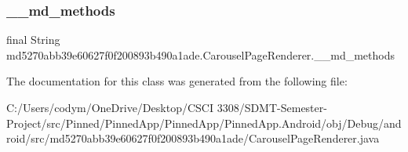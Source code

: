 \subsubsection{\texorpdfstring{\+\_\+\+\_\+md\+\_\+methods}{\_\_md\_methods}}
{\footnotesize\ttfamily final String md5270abb39e60627f0f200893b490a1ade.\+Carousel\+Page\+Renderer.\+\_\+\+\_\+md\+\_\+methods\hspace{0.3cm}{\ttfamily [static]}}



The documentation for this class was generated from the following file\+:\begin{DoxyCompactItemize}
\item 
C\+:/\+Users/codym/\+One\+Drive/\+Desktop/\+C\+S\+C\+I 3308/\+S\+D\+M\+T-\/\+Semester-\/\+Project/src/\+Pinned/\+Pinned\+App/\+Pinned\+App/\+Pinned\+App.\+Android/obj/\+Debug/android/src/md5270abb39e60627f0f200893b490a1ade/Carousel\+Page\+Renderer.\+java\end{DoxyCompactItemize}
